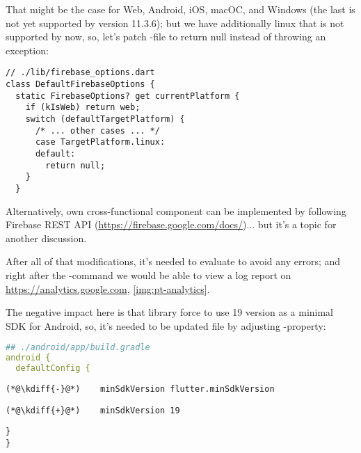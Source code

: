 \noindent That might be the case for Web, Android, iOS, macOC, and Windows (the last is not yet supported by 
 version 11.3.6); but we have additionally linux that is not supported by now, so, let's patch 
-file to return null instead of throwing an exception:

\begin{lstlisting}
// ./lib/firebase_options.dart
class DefaultFirebaseOptions {
  static FirebaseOptions? get currentPlatform {
    if (kIsWeb) return web;
    switch (defaultTargetPlatform) {
      /* ... other cases ... */
      case TargetPlatform.linux:
      default:
        return null;
    }
  }
\end{lstlisting}

\noindent Alternatively, own cross-functional component can be implemented by following Firebase REST API 
(\href{https://firebase.google.com/docs/reference/rest/database}{https://firebase.google.com/docs/})... but it's a 
topic for another discussion.

After all of that modifications, it's needed to evaluate  to avoid any errors; and right after the
-command we would be able to view a log report on 
\href{https://analytics.google.com}{https://analytics.google.com}, \cref{img:pt-analytics}.


\noindent The negative impact here is that  library force to use 19 version as a minimal SDK for 
Android, so, it's needed to be updated  file by adjusting -property:

\begin{lstlisting}[language=yaml]
## ./android/app/build.gradle
android {
  defaultConfig {
\end{lstlisting}
{
\xpretocmd{\lstlisting}{\vspace{-12pt}}{}{}
\begin{lstlisting}[firstnumber=4, backgroundcolor=\color{backred}]
(*@\kdiff{-}@*)    minSdkVersion flutter.minSdkVersion
\end{lstlisting}
\begin{lstlisting}[firstnumber=4, backgroundcolor=\color{backgreen}]
(*@\kdiff{+}@*)    minSdkVersion 19
\end{lstlisting}
\begin{lstlisting}[firstnumber=5]
  }
}
\end{lstlisting}
}

